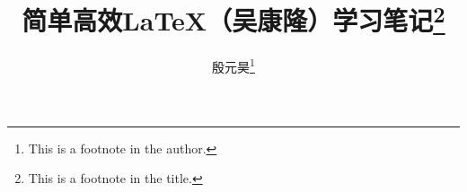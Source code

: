 \documentclass[twoside]{ctexart}
\title{简单高效\LaTeX{}（吴康隆）学习笔记\thanks{This is a footnote in the title.}}
\author{殷元昊\thanks{This is a footnote in the author.}}
\date{}
\begin{document}
\maketitle

\renewcommand{\contentsname}{这是目录}
\tableofcontents

\renewcommand{\listfigurename}{这是插图目录}
\listoffigures

\renewcommand{\listtablename}{这是表格目录}
\listoftables







\theendnotes


\end{document}
